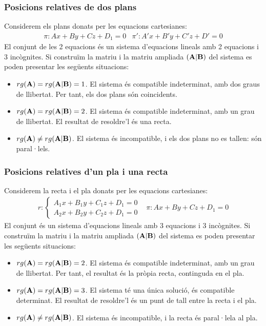 \documentclass{beamer}
\begin{document}
\begin{frame}
  \frametitle{Posicions relatives de dos plans}
  Considerem els plans donats per les equacions cartesianes:
  \[
  \begin{array}{cc}
      \pi:  Ax+By+Cz+D_1=0 &
      \pi': A'x+B'y+C'z+D'=0
  \end{array}
  \]
  El conjunt de les 2 equacions és un sistema d'equacions lineals amb 2 equacions i 3 incògnites. Si construïm la matriu  i la matriu ampliada $(\textbf{A}|\textbf{B})$ del sistema es poden presentar les següents situacions:
  \begin{itemize}
    \item $rg(\textbf{A})=rg(\textbf{A}|\textbf{B})=1$. El sistema és compatible indeterminat, amb dos graus de llibertat. Per tant, els dos plans són coincidents.
    \item $rg(\textbf{A})=rg(\textbf{A}|\textbf{B})=2$. El sistema és compatible indeterminat, amb un grau de llibertat. El resultat de resoldre'l és una recta.
    \item $rg(\textbf{A})\neq rg(\textbf{A}|\textbf{B})$. El sistema és incompatible, i els dos plans no es tallen: són paral·lels.
  \end{itemize}
\end{frame}

\begin{frame}
  \frametitle{Posicions relatives d'un pla i una recta}
  Considerem la recta i el pla donats per les equacions cartesianes:
  \[
  \begin{array}{cc}
    r:\begin{cases}
        A_1x+B_1y+C_1z+D_1=0\\
        A_2x+B_2y+C_2z+D_1=0
      \end{cases}&
      \pi:  Ax+By+Cz+D_1=0
  \end{array}
  \]
  El conjunt és un sistema d'equacions lineals amb 3 equacions i 3 incògnites. Si construïm la matriu  i la matriu ampliada $(\textbf{A}|\textbf{B})$ del sistema es poden presentar les següents situacions:
  \begin{itemize}
    \item $rg(\textbf{A})=rg(\textbf{A}|\textbf{B})=2$. El sistema és compatible indeterminat, amb un grau de llibertat. Per tant, el resultat és la pròpia recta, continguda en el pla.
    \item $rg(\textbf{A})=rg(\textbf{A}|\textbf{B})=3$. El sistema té una única solució, és compatible determinat. El resultat de resoldre'l és un punt de tall entre la recta i el pla.
    \item $rg(\textbf{A})\neq rg(\textbf{A}|\textbf{B})$. El sistema és incompatible, i la recta és paral·lela al pla.
  \end{itemize}
\end{frame}
\end{document}

